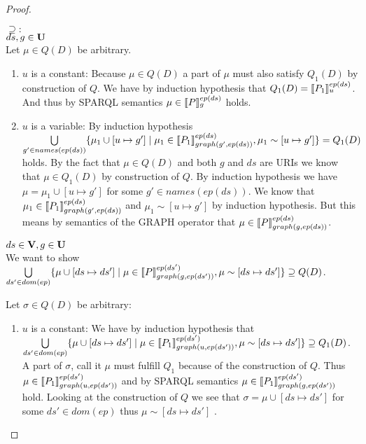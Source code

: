 \begin{proof}
\begin{enumerate}
			\bigskip\noindent$\supseteq:$\\
			$ds,g \in \mathbf{U}$\\
			Let $\mu \in Q(D)$ be arbitrary.
			\begin{enumerate}
				\item $u$ is a constant: Because $\mu \in Q(D)$ a part of $\mu$
					must also satisfy $Q_1(D)$ by construction of $Q$. %
					We have by induction hypothesis that $Q_1(D) = \llbracket P_1
					\rrbracket^{ep(ds)}_{u}$. And thus by SPARQL semantics 
					$\mu \in \llbracket P\rrbracket^{ep(ds)}_{g}$ holds.
				\item $u$ is a variable: By induction hypothesis
					$\bigcup\limits_{g' \in names(ep(ds))} \{ \mu_1 \cup [u\mapsto
						g'] \mid \mu_1 \in \llbracket P_1
						\rrbracket^{ep(ds)}_{graph(g',ep(ds))}, \mu_1 \sim [u
					\mapsto g']\} = Q_1(D)$ holds. 
					By the fact that $\mu \in Q(D)$ and both $g$ and $ds$ are
					URIs we know that $\mu \in Q_1(D)$ by construction of $Q$. 
					By induction hypothesis we have $\mu = \mu_1 \cup [u \mapsto g']$ for some $g' \in
					names(ep(ds))$. We know that $\mu_1 \in \llbracket P_1
					\rrbracket^{ep(ds)}_{graph(g',ep(ds))}$  and $\mu_1 \sim
					[u\mapsto g']$ by induction hypothesis.
					But this means by semantics of the GRAPH operator that $\mu \in \llbracket P
					\rrbracket^{ep(ds)}_{graph(g,ep(ds))}$.
			\end{enumerate}

			\bigskip\noindent
			$ds \in \mathbf{V},g \in \mathbf{U}$\\
			We want to show $\bigcup\limits_{ds' \in dom(ep)} \{ \mu \cup [ds
				\mapsto ds'] 
				\mid \mu \in \llbracket P\rrbracket^{ep(ds')}_{graph(g,ep(ds'))}, \mu \sim
			[ds\mapsto ds'] \}  \supseteq Q(D)$.

			Let $\sigma \in Q(D)$ be arbitrary:
			\begin{enumerate}
				\item $u$ is a constant:
					We have by induction hypothesis that 
					$\bigcup\limits_{ds' \in dom(ep)} \{ \mu \cup [ds \mapsto ds'] \mid \mu \in
						\llbracket P_1\rrbracket^{ep(ds')}_{graph(u,ep(ds'))}, \mu \sim
					[ds\mapsto ds'] \}  \supseteq Q_1(D)$. A part of
					$\sigma$, call it $\mu$ must fulfill $Q_1$ because of the
					construction of $Q$. Thus $\mu \in \llbracket P_1
					\rrbracket^{ep(ds')}_{graph(u,ep(ds'))}$  and by SPARQL semantics $\mu \in \llbracket P_1
					\rrbracket^{ep(ds')}_{graph(g,ep(ds'))}$ hold. 
					Looking at the construction of $Q$ we see that 
					$\sigma = \mu \cup [ds \mapsto ds']$ for some $ds' \in
					dom(ep)$ thus $\mu \sim [ds \mapsto ds']$ .


\end{enumerate}
\end{enumerate}
\end{proof}

